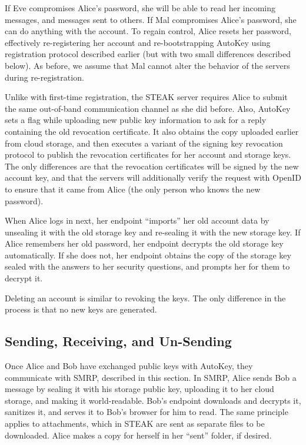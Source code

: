 If Eve compromises Alice's password, she will be able to read her incoming messages, and messages sent to others.  If Mal compromises Alice's password, she can do anything with the account.  To regain control, Alice resets her password, effectively re-registering her account and re-bootstrapping AutoKey using registration protocol described earlier (but with two small differences described below).  As before, we assume that Mal cannot alter the behavior of the servers during re-registration.

Unlike with first-time registration, the STEAK server requires Alice to submit the same out-of-band communication channel as she did before.  Also, AutoKey sets a flag while uploading new public key information to ask for a reply containing the old revocation certificate.  It also obtains the copy uploaded earlier from cloud storage, and then executes a variant of the signing key revocation protocol to publish the revocation certificates for her account and storage keys.  The only differences are that the revocation certificates will be signed by the new account key, and that the servers will additionally verify the request with OpenID to ensure that it came from Alice (the only person who knows the new password).

When Alice logs in next, her endpoint ``imports'' her old account data by unsealing it with the old storage key and re-sealing it with the new storage key.  If Alice remembers her old password, her endpoint decrypts the old storage key automatically.  If she does not, her endpoint obtains the copy of the storage key sealed with the answers to her security questions, and prompts her for them to decrypt it.

Deleting an account is similar to revoking the keys.  The only difference in the process is that no new keys are generated.

\subsection{Sending, Receiving, and Un-Sending}
Once Alice and Bob have exchanged public keys with AutoKey, they communicate with SMRP, described in this section.  In SMRP, Alice sends Bob a message by sealing it with his storage public key, uploading it to her cloud storage, and making it world-readable. Bob's endpoint downloads and decrypts it, sanitizes it, and serves it to Bob's browser for him to read. The same principle applies to attachments, which in STEAK are sent as separate files to be downloaded.  Alice makes a copy for herself in her ``sent'' folder, if desired.

